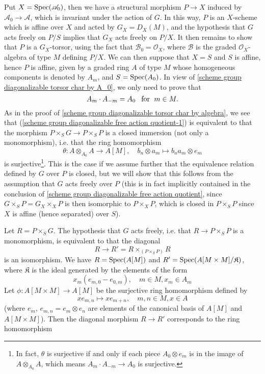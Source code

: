 Put $X=\mathrm{Spec}(\mathscr{A}_0)$, then we have a structural morphism $P\to X$ induced by $\mathscr{A}_0\to\mathscr{A}$, which is invariant under the action of $G$. In this way, $P$ is an $X$-scheme which is affine over $X$ and acted by $G_X=D_X(M)$, and the hypothesis that $G$ acts freely on $P/S$ implies that $G_X$ acts freely on $P/X$. It then remains to show that $P$ is a $G_X$-torsor, using the fact that $\mathscr{B}_0=\mathscr{O}_X$, where $\mathscr{B}$ is the graded $\mathscr{O}_X$-algebra of type $M$ defining $P/X$. We can then suppose that $X=S$ and $S$ is affine, hence $P$ is affine, given by a graded ring $A$ of type $M$ whose homogeneous components is denoted by $A_m$, and $S=\mathrm{Spec}(A_0)$. In view of \cref{scheme group diagonalizable torsor char by A_0}, we only need to prove that
\begin{equation}\label{scheme group diagonalizable free action quotient-1}
A_m\cdot A_{-m}=A_0\hspace{8pt}\text{for}\hspace{6pt} m\in M.
\end{equation}
As in the proof of \cref{scheme group diagonalizable torsor char by algebra}, we see that (\ref{scheme group diagonalizable free action quotient-1}) is equivalent to that the morphism $P\times_SG\to P\times_SP$ is a closed immersion (not only a monomorphism), i.e. that the ring homomorphism
\[\theta:A\otimes_{A_0}A\to A[M],\quad b_n\otimes a_m\mapsto b_na_m\otimes e_m\]
is surjective\footnote{In fact, $\theta$ is surjective if and only if each piece $A_0\otimes e_m$ is in the image of $A\otimes_{A_0}A$, which means $A_m\cdot A_{-m}\to A_0$ is surjective.}. This is the case if we assume further that the equivalence relation defined by $G$ over $P$ is closed, but we will show that this follows from the assumption that $G$ acts freely over $P$ (this is in fact implicitly contained in the conclusion of \cref{scheme group diagonalizable free action quotient}, since $G\times_SP=G_X\times_XP$ is then isomorphic to $P\times_XP$, which is closed in $P\times_SP$ since $X$ is affine (hence separated) over $S$).\par
Let $R=P\times_SG$. The hypothesis that $G$ acts freely, i.e. that $R\to P\times_SP$ is a monomorphism, is equivalent to that the diagonal
\[R\to R'=R\times_{(P\times_SP)}R\]
is an isomorphism. We have $R=\mathrm{Spec}(A[M])$ and $R'=\mathrm{Spec}(A[M\times M]/\mathfrak{K})$, where $\mathfrak{K}$ is the ideal generated by the elements of the form
\[x_m(e_{m,0}-e_{0,m}),\quad m\in M,x_m\in A_m\]
Let $\phi:A[M\times M]\to A[M]$ be the surjective ring homomorphism defined by
\[xe_{m,n}\mapsto xe_{m+n},\quad m,n\in M,x\in A\]
(where $e_m$, $e_{m,n}=e_m\otimes e_n$ are elements of the canonical basis of $A[M]$ and $A[M\times M]$). Then the diagonal morphism $R\to R'$ corresponds to the ring homomorphism
